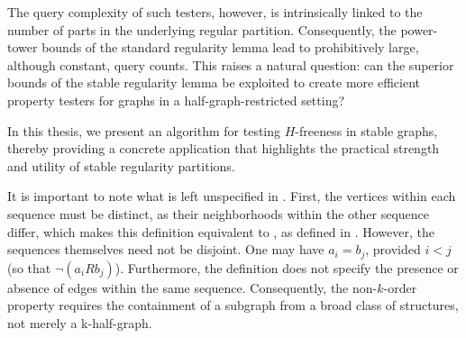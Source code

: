     The query complexity of such testers, however, is intrinsically linked to the number of parts in the underlying regular
    partition.
    Consequently, the power-tower bounds of the standard regularity lemma lead to prohibitively large, although constant,
    query counts.
    This raises a natural question: can the superior bounds of the stable regularity lemma be exploited to create more
    efficient property testers for graphs in a half-graph-restricted setting?

    In this thesis, we present an algorithm for testing $H$-freeness in stable graphs, thereby providing
    a concrete application that highlights the practical strength and utility of stable regularity partitions.



            It is important to note what is left unspecified in .
            First, the vertices within each sequence must be distinct, as their neighborhoods within the other sequence
            differ, which makes this definition equivalent to , as defined in .
            However, the sequences themselves need not be disjoint.
            One may have $a_i=b_j$, provided $i < j$ (so that $\neg(a_i R b_j)$).
            Furthermore, the definition does not specify the presence or absence of edges within the same sequence.
            Consequently, the non-$k$-order property requires the containment of a subgraph from a broad class of structures,
            not merely a k-half-graph.










